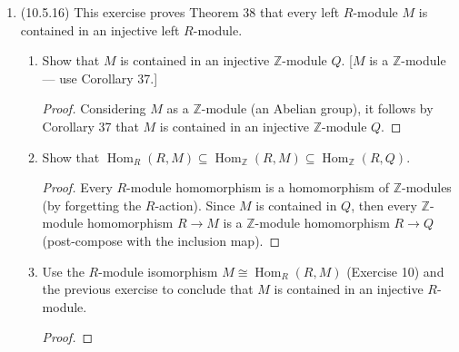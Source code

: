 \documentclass[11pt]{article}
\DeclareMathOperator{\Hom}{Hom}
\begin{document}
\begin{enumerate}
\begin{enumerate}
\begin{proof}
            Then we check that $F^\prime\circ \psi = f^\prime$; that is, for given $a\in A$, for every $r\in R$ we have $[(F^\prime\circ\psi)(a)](r) = f^\prime(a)(r)$. Indeed, $[(F^\prime\circ\psi)(a)](r) = F^\prime(\psi(a))(r) = F(r\psi(a)) = F(\psi(ra)) = f(ra) = f^\prime(ra)(1_R) = (rf^\prime(a))(1_R) = f^\prime(a)(1_R r) = f^\prime(a)(r)$ as desired.
        \end{proof}
        \item Prove that if $Q$ is an injective $\mathbb{Z}$-module then $\Hom_{\mathbb{Z}}(R,Q)$ is an injective $R$-module. \begin{proof}
            Let $A$ and $B$ be $R$-modules, and let $\psi\colon A\to B$ be injective as above. Since $Q$ is an injective $\mathbb{Z}$-module it is able to lift $\mathbb{Z}$-module maps $f\colon A\to Q$ to maps $F\colon B\to Q$ as in (b). It follows by the result in (b) that $\Hom_\mathbb{Z}(R,Q)$ also has the desired lifting property, so that it is an injecive $R$-module.
        \end{proof}
    \end{enumerate}
    \item (10.5.16) This exercise proves Theorem 38 that every left $R$-module $M$ is contained in an injective left $R$-module.\begin{enumerate}
        \item Show that $M$ is contained in an injective $\mathbb{Z}$-module $Q$. [$M$ is a $\mathbb{Z}$-module --- use Corollary 37.] \begin{proof}
            Considering $M$ as a $\mathbb{Z}$-module (an Abelian group), it follows by Corollary 37 that $M$ is contained in an injective $\mathbb{Z}$-module $Q$.
        \end{proof}
        \item Show that $\Hom_{R}(R,M)\subseteq\Hom_{\mathbb{Z}}(R,M)\subseteq\Hom_{\mathbb{Z}}(R,Q)$.\begin{proof}
            Every $R$-module homomorphism is a homomorphism of $\mathbb{Z}$-modules (by forgetting the $R$-action). Since $M$ is contained in $Q$, then every $\mathbb{Z}$-module homomorphism $R\to M$ is a $\mathbb{Z}$-module homomorphism $R\to Q$ (post-compose with the inclusion map).
        \end{proof}
        \item Use the $R$-module isomorphism $M\cong\Hom_R(R,M)$ (Exercise 10) and the previous exercise to conclude that $M$ is contained in an injective $R$-module. \begin{proof}

\end{proof}
\end{enumerate}
\end{enumerate}
\end{document}
